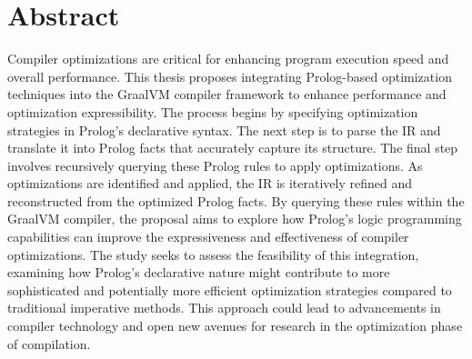 \chapter[Abstract]{Abstract}

\noindent
Compiler optimizations are critical for enhancing program execution speed and overall performance. This thesis proposes integrating Prolog-based optimization techniques into the GraalVM compiler framework to enhance performance and optimization expressibility. The process begins by specifying optimization strategies in Prolog’s declarative syntax. The next step is to parse the IR and translate it into Prolog facts that accurately capture its structure. The final step involves recursively querying these Prolog rules to apply optimizations. As optimizations are identified and applied, the IR is iteratively refined and reconstructed from the optimized Prolog facts. By querying these rules within the GraalVM compiler, the proposal aims to explore how Prolog’s logic programming capabilities can improve the expressiveness and effectiveness of compiler optimizations. The study seeks to assess the feasibility of this integration, examining how Prolog’s declarative nature might contribute to more sophisticated and potentially more efficient optimization strategies compared to traditional imperative methods. This approach could lead to advancements in compiler technology and open new avenues for research in the optimization phase of compilation.
